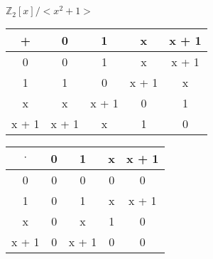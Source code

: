 \documentclass{article}
\begin{document}
$\mathbb{Z}_{2}[x]/<x^{2}+1>$
\newline
\newline
\begin{tabular}{c | c c c c}
  + & 0 & 1 & x & x + 1 \\
  \hline
  0 & 0 & 1 & x & x + 1 \\
  1 & 1 & 0 & x + 1 & x \\
  x & x & x + 1 & 0 & 1 \\
  x + 1 & x + 1 & x & 1 & 0 \\
\end{tabular}
\newline
\newline

\begin{tabular}{c | c c c c}
  $\cdot$ & 0 & 1 & x & x + 1 \\
  \hline
  0 & 0 & 0 & 0 & 0 \\
  1 & 0 & 1 & x & x + 1 \\
  x & 0 & x & 1 & 0 \\
  x + 1 & 0 & x + 1 & 0 & 0 \\
\end{tabular}
\end{document}
